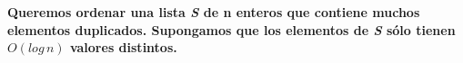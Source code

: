 \textbf{Queremos ordenar una lista \textit{S} de n enteros que contiene
muchos elementos duplicados. Supongamos que los elementos de \textit{S}
sólo tienen $O(log \, n)$ valores distintos.}\\